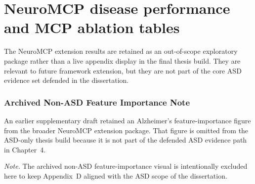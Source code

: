 \section{NeuroMCP disease performance and MCP ablation tables}
\label{sec:appendix_ch4_s6}

\noindent The NeuroMCP extension results are retained as an out-of-scope exploratory package rather than a live appendix display in the final thesis build. They are relevant to future framework extension, but they are not part of the core ASD evidence set defended in the dissertation.

\label{tab:neuromcp_disease_performance}
\label{tab:mcp_system_ablation}



\subsubsection{Archived Non-ASD Feature Importance Note}
\label{sec:alzheimer_feature_importance}

\label{fig:alzheimer_feature_importance}
An earlier supplementary draft retained an Alzheimer's feature-importance figure from the broader NeuroMCP extension package. That figure is omitted from the ASD-only thesis build because it is not part of the defended ASD evidence path in Chapter~4.

\noindent\textit{Note.} The archived non-ASD feature-importance visual is intentionally excluded here to keep Appendix~D aligned with the ASD scope of the dissertation.

